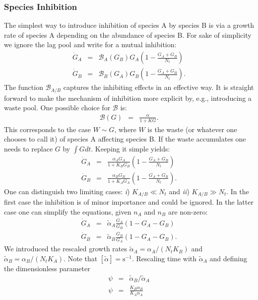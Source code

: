 \documentclass[10pt,A4paper]{article}
\begin{document}
\subsubsection{Species Inhibition}
The simplest way to introduce inhibition of species A by species B is via a growth rate of species A depending on the abundance of species B. 
For sake of simplicity we ignore the lag pool and write for a mutual inhibition:
\begin{eqnarray}
\dot{G}_A &=& \mathcal{B}_A(G_B)G_A\left(1 - \frac{G_A+G_B}{N_t}\right )\\
\dot{G}_B &=& \mathcal{B}_B(G_A) G_B\left(1-\frac{G_A+G_B}{N_t}\right ). 
\end{eqnarray}
The function $\mathcal{B}_{A/B}$ captures the inhibiting effects in an effective way. 
It is straight forward to make the mechanism of inhibition more explicit by, e.g., introducing a waste pool. 
One possible choice for $\mathcal{B}$ is: 
\begin{eqnarray}
\mathcal{B}(G)&=&\frac{\alpha}{1+KG}. 
\end{eqnarray}
This corresponds to the case $W\sim G$, where $W$ is the waste (or whatever one chooses to call it) of species A affecting species B. 
If the waste accumulates one needs to replace $G$ by $\int G dt$. Keeping it simple yields:
\begin{eqnarray}
\dot{G}_A &=& \frac{\alpha_A G_A}{1+K_BG_B}\left(1 - \frac{G_A+G_B}{N_t}\right )\\
\dot{G}_B &=& \frac{\alpha_B G_B}{1+K_AG_A}\left(1-\frac{G_A+G_B}{N_t}\right ). 
\end{eqnarray}
One can distinguish two limiting cases: {\it i}) $K_{A/B}\ll N_t$ and {\it ii}) $K_{A/B}\gg N_t$. 
In the first case the inhibition is of minor importance and could be ignored. 
In the latter case one can simplify the equations, given $n_A$ and $n_B$ are non-zero:
\begin{eqnarray}
\label{Mut_Inhib}
\dot{G}_A &=&\tilde{\alpha}_A\frac{G_A}{G_B}\left(1 - G_A-G_B\right )\\
\dot{G}_B &=& \tilde{\alpha}_B\frac{G_B}{G_A}\left(1-G_A-G_B\right ). 
\end{eqnarray}
We introduced the rescaled growth rates $\tilde{\alpha}_A=\alpha_A/(N_tK_B)$ and $\tilde{\alpha}_B=\alpha_B/(N_tK_A)$. Note that $[\tilde{\alpha}]=\mathrm{s}^{-1}$. Rescaling time with $\tilde{\alpha}_A$ and defining the dimensionless parameter 
\begin{eqnarray}
\psi&=&\tilde{\alpha}_B/\tilde{\alpha}_A\\
\psi&=&\frac{K_B\alpha_B}{K_A\alpha_A}
\end{eqnarray}
\end{document}

